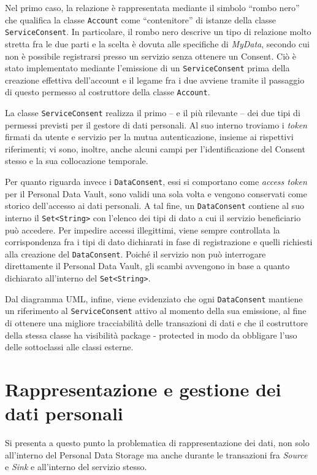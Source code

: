 Nel primo caso, la relazione \`e rappresentata mediante il simbolo “rombo nero” che qualifica la classe \texttt{Account} come “contenitore” di istanze della classe \texttt{ServiceConsent}. In particolare, il rombo nero descrive un tipo di relazione molto stretta fra le due parti e la scelta \`e dovuta alle specifiche di \textit{MyData}, secondo cui non \`e possibile registrarsi presso un servizio senza ottenere un Consent. Ci\`o \`e stato implementato mediante l’emissione di un \texttt{ServiceConsent} prima della creazione effettiva dell’account e il legame fra i due avviene tramite il passaggio di questo permesso al costruttore della classe \texttt{Account}.

La classe \texttt{ServiceConsent} realizza il primo – e il pi\`u rilevante – dei due tipi di permessi previsti per il gestore di dati personali. Al suo interno troviamo i \textit{token} firmati da utente e servizio per la mutua autenticazione, insieme ai rispettivi riferimenti; vi sono, inoltre, anche alcuni campi per l’identificazione del Consent stesso e la sua collocazione temporale.

Per quanto riguarda invece i \texttt{DataConsent}, essi si comportano come \textit{access token} per il Personal Data Vault, sono validi una sola volta e vengono conservati come storico dell’accesso ai dati personali. A tal fine, un \texttt{DataConsent} contiene al suo interno il \texttt{Set<String>} con l’elenco dei tipi di dato a cui il servizio beneficiario pu\`o accedere. Per impedire accessi illegittimi, viene sempre controllata la corrispondenza fra i tipi di dato dichiarati in fase di registrazione e quelli richiesti alla creazione del \texttt{DataConsent}. Poich\'e il servizio non pu\`o interrogare direttamente il Personal Data Vault, gli scambi avvengono in base a quanto dichiarato all’interno del \texttt{Set<String>}.

Dal diagramma UML, infine, viene evidenziato che ogni \texttt{DataConsent} mantiene un riferimento al \texttt{ServiceConsent} attivo al momento della sua emissione, al fine di ottenere una migliore tracciabilit\`a delle transazioni di dati e che il costruttore della stessa classe ha visibilit\`a package - protected in modo da obbligare l’uso delle sottoclassi alle classi esterne.

\section{Rappresentazione e gestione dei dati personali}
\label{sec:P-datinonnotiapriori}
Si presenta a questo punto la problematica di rappresentazione dei dati, non solo all’interno del Personal Data Storage ma anche durante le transazioni fra \textit{Source} e \textit{Sink} e all’interno del servizio stesso.

